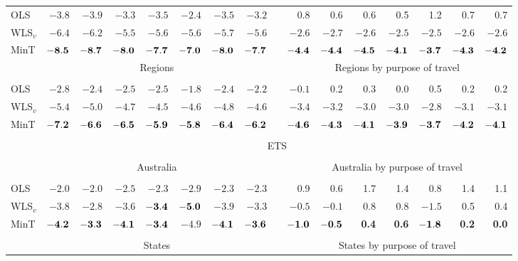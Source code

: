 \documentclass[twocolumn]{svjour3}
\begin{document}
\begin{table*}[!htb]
\begin{threeparttable}
\begin{tabular}{lrrrrrrrrrrrrrrr}
			\cline{2-8}\cline{10-16} \\[-0.3cm]
			OLS & $-3.8$ & $-3.9$ & $-3.3$ & $-3.5$ & $-2.4$ & $-3.5$ & $-3.2$ & & 0.8 & 0.6 & 0.6 & 0.5 & 1.2 & 0.7 & 0.7 \\
			WLS$_v$ & $-6.4$ & $-6.2$ & $-5.5$ & $-5.6$ & $-5.6$ & $-5.7$ & $-5.6$ & & $-2.6$ & $-2.7$ & $-2.6$ & $-2.5$ & $-2.5$ & $-2.6$ & $-2.6$ \\
			MinT & $\bf{ -8.5}$ & $\bf{ -8.7}$ & $\bf{ -8.0}$ & $\bf{ -7.7}$ & $\bf{ -7.0}$ & $\bf{ -8.0}$ & $\bf{ -7.7}$ & & $\bf{ -4.4}$ & $\bf{ -4.4}$ & $\bf{ -4.5}$ & $\bf{ -4.1}$ & $\bf{ -3.7}$ & $\bf{ -4.3}$ & $\bf{ -4.2}$ \\
			& \multicolumn{7}{c}{Regions} & & \multicolumn{7}{c}{Regions by purpose of travel} \\
			\cline{2-8}\cline{10-16} \\[-0.3cm]
			OLS & $-2.8$ & $-2.4$ & $-2.5$ & $-2.5$ & $-1.8$ & $-2.4$ & $-2.2$ & & $-0.1$ & 0.2 & 0.3 & 0.0 & 0.5 & 0.2 & 0.2 \\
			WLS$_v$ & $-5.4$ & $-5.0$ & $-4.7$ & $-4.5$ & $-4.6$ & $-4.8$ & $-4.6$ & & $-3.4$ & $-3.2$ & $-3.0$ & $-3.0$ & $-2.8$ & $-3.1$ & $-3.1$ \\
			MinT & $\bf{ -7.2}$ & $\bf{ -6.6}$ & $\bf{ -6.5}$ & $\bf{ -5.9}$ & $\bf{ -5.8}$ & $\bf{ -6.4}$ & $\bf{ -6.2}$ & & $\bf{ -4.6}$ & $\bf{ -4.3}$ & $\bf{ -4.1}$ & $\bf{ -3.9}$ & $\bf{ -3.7}$ & $\bf{ -4.2}$ & $\bf{ -4.1}$ \\
			\cline{2-8}\cline{10-16} \\[-0.3cm]
			& \multicolumn{15}{c}{ETS} \\
			\cline{2-16} \\[-0.3cm]
			& \multicolumn{7}{c}{Australia} & & \multicolumn{7}{c}{Australia by purpose of travel} \\
			\cline{2-8}\cline{10-16} \\[-0.3cm]
			OLS & $-2.0$ & $-2.0$ & $-2.5$ & $-2.3$ & $-2.9$ & $-2.3$ & $-2.3$ & & 0.9 & 0.6 & 1.7 & 1.4 & 0.8 & 1.4 & 1.1 \\
			WLS$_v$ & $-3.8$ & $-2.8$ & $-3.6$ & $\bf{ -3.4}$ & $\bf{ -5.0}$ & $-3.9$ & $-3.3$ & & $-0.5$ & $-0.1$ & 0.8 & 0.8 & $-1.5$ & 0.5 & 0.4 \\
			MinT & $\bf{ -4.2}$ & $\bf{ -3.3}$ & $\bf{ -4.1}$ & $\bf{ -3.4}$ & $-4.9$ & $\bf{ -4.1}$ & $\bf{ -3.6}$ & & $\bf{ -1.0}$ & $\bf{ -0.5}$ & \bf{ 0.4} & \bf{ 0.6} & $\bf{ -1.8}$ & \bf{ 0.2} & \bf{ 0.0} \\
			\cline{2-8}\cline{10-16} \\[-0.3cm]
			& \multicolumn{7}{c}{States} & & \multicolumn{7}{c}{States by purpose of travel} \\

\end{tabular}
\end{threeparttable}
\end{table*}
\end{document}
